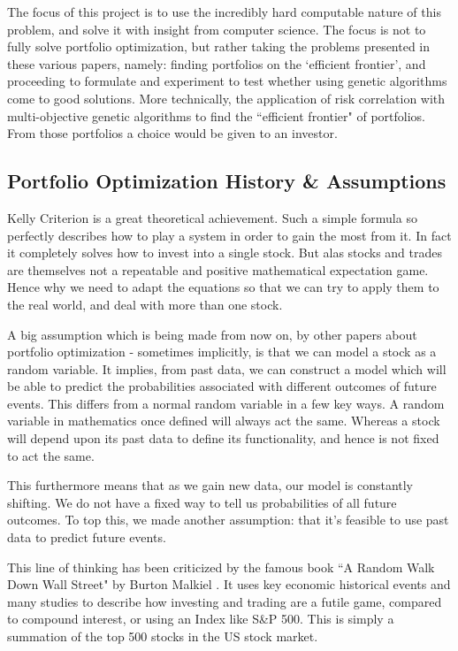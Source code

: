 \documentclass[11pt]{article}
\begin{document}
    The focus of this project is to use the incredibly hard computable nature
    of this problem, and solve it with insight from computer science. The focus
    is not to fully solve portfolio optimization, but rather taking the problems
    presented in these various papers, namely: finding portfolios on the
    `efficient frontier', and proceeding to formulate and experiment to test
    whether using genetic algorithms come to good solutions. More technically,
    the application of risk correlation with multi-objective genetic algorithms
    to find the ``efficient frontier" of portfolios. From those portfolios a choice
    would be given to an investor.

\subsection{Portfolio Optimization History \& Assumptions}

    Kelly Criterion \cite{Kelly} is a great theoretical achievement. Such a simple formula so
    perfectly describes how to play a system in order to gain the most from it. In fact
    it completely solves how to invest into a single stock. But alas
    stocks and trades are themselves not a repeatable and positive mathematical expectation
    game. Hence why we need to adapt the equations so that we can try to apply them to the
    real world, and deal with more than one stock.

    A big assumption which is being made from now on, by other papers about portfolio
    optimization - sometimes implicitly,
    is that we can model a stock as a random variable. It
    implies, from past data, we can construct a model which will be able
    to predict the probabilities associated with different outcomes of future events.
    This differs from a normal random variable in a few key ways. A random variable in
    mathematics once defined will always act the same. Whereas a stock will
    depend upon its past data to define its functionality, and hence is not fixed to act
    the same.

    This furthermore means that as we gain new data, our model is constantly shifting.
    We do not have a fixed way to tell us probabilities of all future outcomes.
    To top this, we made another assumption: that it's feasible to use past data to predict
    future events.

    This line of thinking has been criticized by the famous book ``A Random Walk Down
    Wall Street" by Burton Malkiel \cite{BurtonMalkiel}. It uses
    key economic historical events and many studies to describe how investing and trading are
    a futile game, compared to compound interest, or using an Index like S\&P 500. This is
    simply a summation of the top 500 stocks in the US stock market.
\end{document}
